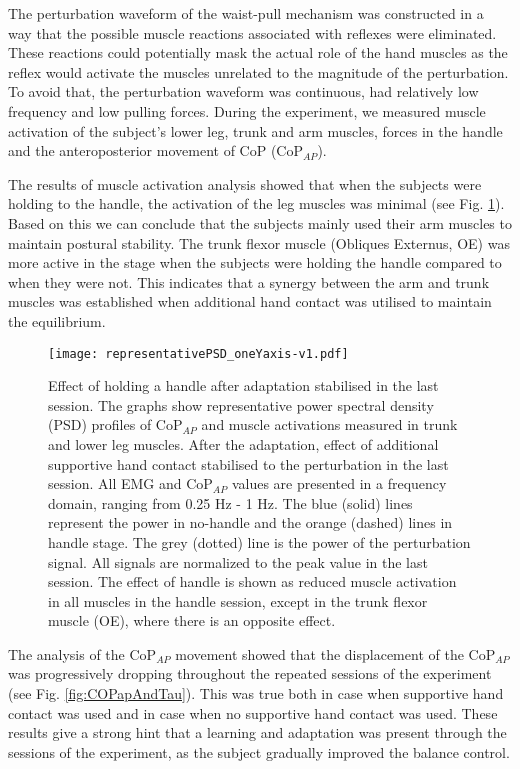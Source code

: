 The perturbation waveform of the waist-pull mechanism was constructed in a way that the possible muscle reactions associated with reflexes were eliminated. These reactions could potentially mask the actual role of the hand muscles as the reflex would activate the muscles unrelated to the magnitude of the perturbation. To avoid that, the perturbation waveform was continuous, had relatively low frequency and low pulling forces. During the experiment, we measured muscle activation of the subject's lower leg, trunk and arm muscles, forces in the handle and the anteroposterior movement of CoP (CoP$_{AP}$).

The results of muscle activation analysis showed that when the subjects were holding to the handle, the activation of the leg muscles was minimal (see Fig. \ref{fig:representativePSD}). Based on this we can conclude that the subjects mainly used their arm muscles to maintain postural stability. The trunk flexor muscle (Obliques Externus, OE) was more active in the stage when the subjects were holding the handle compared to when they were not. This indicates that a synergy between the arm and trunk muscles was established when additional hand contact was utilised to maintain the equilibrium.

\begin{figure}[!t]
	\begin{center}
		\texttt{[image: representativePSD\_oneYaxis-v1.pdf]}
		\caption{Effect of holding a handle after adaptation stabilised in the last session. The graphs show representative power spectral density (PSD) profiles of CoP$_{AP}$ and muscle activations measured in trunk and lower leg muscles. After the adaptation, effect of additional supportive hand contact stabilised to the perturbation in the last session. All EMG and CoP$_{AP}$ values are presented in a frequency domain, ranging from 0.25 Hz - 1 Hz. The blue (solid) lines represent the power in no-handle and the orange (dashed) lines in handle stage. The grey (dotted) line is the power of the perturbation signal. All signals are normalized to the peak value in the last session. The effect of handle is shown as reduced muscle activation in all muscles in the handle session, except in the trunk flexor muscle (OE), where there is an opposite effect.}
		\label{fig:representativePSD}
	\end{center}
\end{figure}

The analysis of the CoP$_{AP}$ movement showed that the displacement of the CoP$_{AP}$ was progressively dropping throughout the repeated sessions of the experiment (see Fig. \ref{fig:COPapAndTau}). This was true both in case when supportive hand contact was used and in case when no supportive hand contact was used. These results give a strong hint that a learning and adaptation was present through the sessions of the experiment, as the subject gradually improved the balance control.


